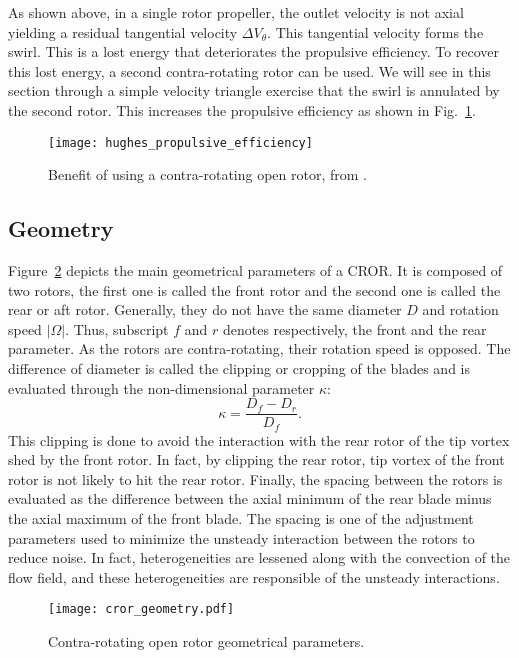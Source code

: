 
As shown above, in a single rotor propeller, the outlet velocity is not axial
yielding a residual tangential velocity $\Delta V_{\theta}$. 
This tangential velocity forms the swirl. 
This is a lost energy that deteriorates the propulsive efficiency. 
To recover this lost energy, a second contra-rotating rotor can be used.
We will see in this section through a simple velocity triangle exercise that
the swirl is annulated by the second rotor. This increases the propulsive
efficiency as shown in Fig.~\ref{fig:hughes_propulsive_efficiency}.
\begin{figure}[htb]
  \centering
  \texttt{[image: hughes\_propulsive\_efficiency]}
  \caption{Benefit of using a contra-rotating open rotor, from \citet{Hughes1989}.}
  \label{fig:hughes_propulsive_efficiency}
\end{figure}

\subsection{Geometry}
\label{sub:cror_geometry}

Figure~\ref{fig:cror_geometry} depicts the main
geometrical parameters of a CROR.
It is composed of two rotors, the first one is called
the front rotor and the second one is called the rear or aft rotor.
Generally, they do not have the same diameter $D$ and rotation speed
$| \Omega |$. Thus, subscript $f$ and $r$ denotes respectively,
the front and the rear parameter.
As the rotors are contra-rotating, their rotation speed is opposed.
The difference of diameter is called the clipping or cropping
of the blades and is evaluated through the non-dimensional parameter
$\kappa$:
\begin{equation}
    \kappa = \frac{D_f - D_r}{D_f}.
\end{equation}
This clipping is done to avoid the interaction 
with the rear rotor of the tip vortex shed
by the front rotor. In fact, by clipping the rear
rotor, tip vortex of the front rotor is not likely
to hit the rear rotor.
Finally, the spacing between the rotors
is evaluated as the difference between the axial minimum of the
rear blade minus the axial maximum of the front blade. The spacing
is one of the adjustment parameters used to minimize the unsteady
interaction between the rotors to reduce noise. In fact, 
heterogeneities are lessened along with the convection of
the flow field, and these heterogeneities are responsible
of the unsteady interactions.
\begin{figure}[htbp]
  \centering
  \texttt{[image: cror\_geometry.pdf]}
  \caption{Contra-rotating open rotor geometrical parameters.}
  \label{fig:cror_geometry}
\end{figure}

